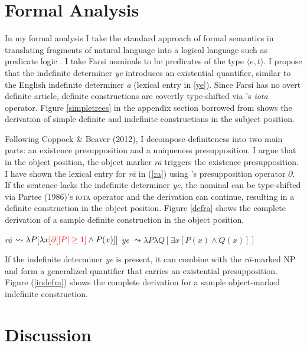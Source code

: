 \documentclass[12pt]{article}
\begin{document}
\section {Formal Analysis} \label {analysis}

In my formal analysis I take the standard approach of formal semantics in translating fragments of natural language into a logical language such as predicate logic \citep{montague1973proper,heim1998semantics}. I take Farsi nominals to be predicates of the type $\langle e,t\rangle$. I propose that the indefinite determiner \emph{ye} introduces an existential quantifier, similar to the English indefinite determiner \emph{a} (lexical entry in \ref{ye}). Since Farsi has no overt definite article, definite constructions are covertly type-shifted via \cite{partee1987noun}'s \emph{iota} operator. Figure \ref{simpletrees} in the appendix section borrowed from \cite{jasbi2016} shows the derivation of simple definite and indefinite constructions in the subject position.

Following Coppock \& Beaver (2012), I decompose definiteness into two main parts: an existence presupposition and a uniqueness presupposition. I argue that in the object position, the object marker \emph{r\={a}} triggers the existence presupposition. I have shown the lexical entry for \emph{r\={a}} in (\ref{ra}) using \cite{beaver2001partial}'s presupposition operator $\partial$. If the sentence lacks the indefinite determiner \emph{ye}, the nominal can be type-shifted via Partee (1986)'s \textsc{iota} operator and the derivation can continue, resulting in a definite construction in the object position. Figure \ref{defra} shows the complete derivation of a sample definite construction in the object position.  

\begin {exe}
\ex \begin {xlist}
\ex \label {ra}\emph{r\={a}} $\leadsto \lambda P [\lambda x [{\color {red}\partial [|P|\geq 1]}  \land P(x)]]$
\ex \label {ye}\emph{ye} $\leadsto  \lambda P \lambda Q [\exists x [P(x) \land Q (x)]]$
\end {xlist}
\end {exe}

If the indefinite determiner \emph{ye} is present, it can combine with the \emph{r\={a}}-marked NP and form a generalized quantifier that carries an existential presupposition. Figure (\ref{indefra}) shows the complete derivation for a sample object-marked indefinite construction.

\section {Discussion}
\end{document}
